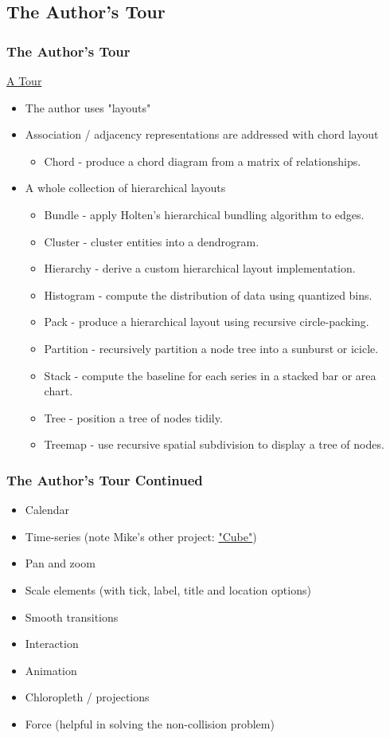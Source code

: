 \documentclass{beamer}
\begin{document}
\subsection{The Author's Tour}


\begin{frame}
\frametitle{The Author's Tour}
\href{http://mbostock.github.com/d3/talk/20111018/#0}{A Tour}
\begin{itemize}
\item The author uses "layouts"
\item Association / adjacency representations are addressed with chord layout
    \begin{itemize}
    \item Chord - produce a chord diagram from a matrix of relationships.
    \end{itemize}
\item A whole collection of hierarchical layouts 
    \begin{itemize}
    \item Bundle - apply Holten's hierarchical bundling algorithm to edges.
    \item Cluster - cluster entities into a dendrogram.
    \item Hierarchy - derive a custom hierarchical layout implementation.
    \item Histogram - compute the distribution of data using quantized bins.
    \item Pack - produce a hierarchical layout using recursive circle-packing.
    \item Partition - recursively partition a node tree into a sunburst or icicle.
    \item Stack - compute the baseline for each series in a stacked bar or area chart.
    \item Tree - position a tree of nodes tidily.
    \item Treemap - use recursive spatial subdivision to display a tree of nodes.
    \end{itemize}
\end{itemize}
\end{frame}



\begin{frame}
\frametitle{The Author's Tour Continued}
\begin{itemize}
\item Calendar
\item Time-series (note Mike's other project: \href{https://github.com/square/cube}{"Cube"})
\item Pan and zoom 
\item Scale elements (with tick, label, title and location options)
\item Smooth transitions
\item Interaction 
\item Animation
\item Chloropleth / projections
\item Force (helpful in solving the non-collision problem)
\end{itemize}
\end{frame}
\end{document}
